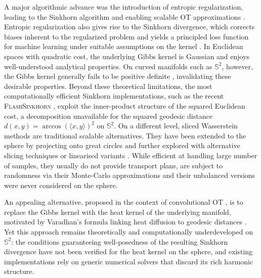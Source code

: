 \documentclass{article}
\theoremstyle{plain}
\theoremstyle{definition}
\theoremstyle{remark}
\begin{document}
A major algorithmic advance was the introduction of entropic regularization, leading to the Sinkhorn algorithm and enabling scalable OT approximations \cite{cuturi2013sinkhorn}. Entropic regularization also gives rise to the Sinkhorn divergence, which corrects biases inherent to the regularized problem and yields a principled loss function for machine learning under suitable assumptions on the kernel \cite{pmlr-v89-feydy19a}. In Euclidean spaces with quadratic cost, the underlying Gibbs kernel is Gaussian and enjoys well-understood analytical properties. On curved manifolds such as $\mathbb{S}^2$, however, the Gibbs kernel generally fails to be positive definite \cite{jayasumana2015kernel, feragen2015geodesic, da2025invariant}, invalidating these desirable properties. Beyond these theoretical limitations, the most computationally efficient Sinkhorn implementations, such as the recent \textsc{FlashSinkhorn} \cite{flashsinkhorn}, exploit the inner-product structure of the squared Euclidean cost, a decomposition unavailable for the squared geodesic distance $d(x,y)=\arccos(\langle x, y \rangle)^2$ on $\mathbb{S}^2$. On a different level, sliced Wasserstein methods are traditional scalable alternatives. They have been extended to the sphere by projecting onto great circles \cite{bonetSphericalSlicedWasserstein2022} and further explored with alternative slicing techniques \cite{quellmalzSlicedOptimalTransport2023, quellmalz2024parallelly, tranStereographicSphericalSliced2024} or linearised variants \cite{liuLinearSphericalSliced2024}. While efficient at handling large number of samples, they usually do not provide transport plans, are subject to randomness via their Monte-Carlo approximations and their unbalanced versions~\cite{bonet2024slicing} were never considered on the sphere.

An appealing alternative, proposed in the context of convolutional OT \cite{solomon2015convolutional}, is to replace the Gibbs kernel with the heat kernel of the underlying manifold, motivated by Varadhan's formula linking heat diffusion to geodesic distances \cite{varadhan1967}. Yet this approach remains theoretically and computationally underdeveloped on $\mathbb{S}^2$: the conditions guaranteeing well-posedness of the resulting Sinkhorn divergence have not been verified for the heat kernel on the sphere, and existing implementations rely on generic numerical solvers that discard its rich harmonic structure.
\end{document}

